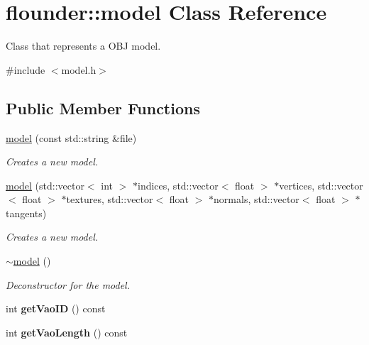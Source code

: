 \hypertarget{classflounder_1_1model}{}\section{flounder\+:\+:model Class Reference}
\label{classflounder_1_1model}


Class that represents a O\+BJ model.  




{\ttfamily \#include $<$model.\+h$>$}

\subsection*{Public Member Functions}
\begin{DoxyCompactItemize}
\item 
\hyperlink{classflounder_1_1model_aa91d042d6c08955bb113803933bbfdd6}{model} (const std\+::string \&file)
\begin{DoxyCompactList}\small\item\em Creates a new model. \end{DoxyCompactList}\item 
\hyperlink{classflounder_1_1model_ac66ffb48f0139fbcda4d216ba8c5a7f3}{model} (std\+::vector$<$ int $>$ $\ast$indices, std\+::vector$<$ float $>$ $\ast$vertices, std\+::vector$<$ float $>$ $\ast$textures, std\+::vector$<$ float $>$ $\ast$normals, std\+::vector$<$ float $>$ $\ast$tangents)
\begin{DoxyCompactList}\small\item\em Creates a new model. \end{DoxyCompactList}\item 
\hyperlink{classflounder_1_1model_afd864365f858cc9bc0bf260bb6212a76}{$\sim$model} ()
\begin{DoxyCompactList}\small\item\em Deconstructor for the model. \end{DoxyCompactList}\item 
\mbox{\label{classflounder_1_1model_a9de8561fde41d5cb14153c247106ae73}} 
int {\bfseries get\+Vao\+ID} () const
\item 
\mbox{\label{classflounder_1_1model_af6cc4346fc20a62d01ec56dbce86863c}} 
int {\bfseries get\+Vao\+Length} () const
\end{DoxyCompactItemize}

